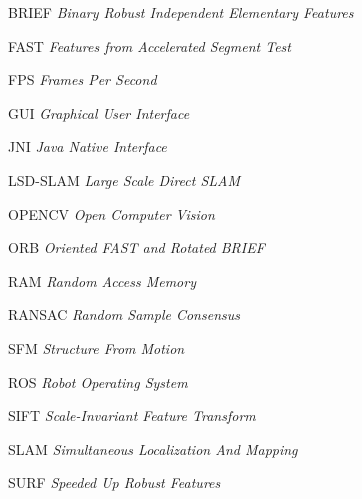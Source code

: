 
\begin{siglas}
\item[BRIEF]\textit{Binary Robust Independent Elementary Features}
\item[FAST]\textit{Features from Accelerated Segment Test}
\item[FPS]\textit{Frames Per Second}
\item[GUI]\textit{Graphical User Interface}
\item[JNI]\textit{Java Native Interface}
\item[LSD-SLAM]\textit{Large Scale Direct SLAM} 
\item[OPENCV]\textit{Open Computer Vision}
\item[ORB]\textit{Oriented FAST and Rotated BRIEF}
\item[RAM]\textit{Random Access Memory}
\item[RANSAC]\textit{Random Sample Consensus}
\item[SFM]\textit{Structure From Motion}
\item[ROS]\textit{Robot Operating System}
\item[SIFT]\textit{Scale-Invariant Feature Transform}
\item[SLAM]\textit{Simultaneous Localization And Mapping}
\item[SURF]\textit{Speeded Up Robust Features}
\end{siglas}
